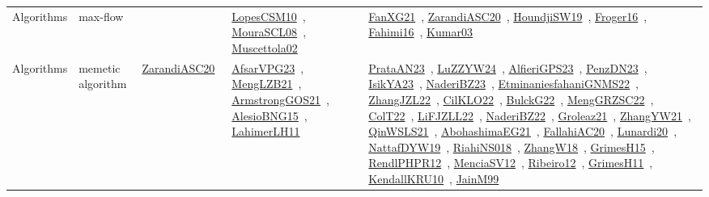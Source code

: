 {\begin{longtable}{lp{3cm}>{\raggedright\arraybackslash}p{6cm}>{\raggedright\arraybackslash}p{6cm}>{\raggedright\arraybackslash}p{8cm}}
\index{max-flow}\index{Algorithms!max-flow}Algorithms & max-flow &  & \href{../works/LopesCSM10.pdf}{LopesCSM10}~\cite{LopesCSM10}, \href{../works/MouraSCL08.pdf}{MouraSCL08}~\cite{MouraSCL08}, \href{../works/Muscettola02.pdf}{Muscettola02}~\cite{Muscettola02} & \href{../works/FanXG21.pdf}{FanXG21}~\cite{FanXG21}, \href{../works/ZarandiASC20.pdf}{ZarandiASC20}~\cite{ZarandiASC20}, \href{../works/HoundjiSW19.pdf}{HoundjiSW19}~\cite{HoundjiSW19}, \href{../works/Froger16.pdf}{Froger16}~\cite{Froger16}, \href{../works/Fahimi16.pdf}{Fahimi16}~\cite{Fahimi16}, \href{../works/Kumar03.pdf}{Kumar03}~\cite{Kumar03}\\
\index{memetic algorithm}\index{Algorithms!memetic algorithm}Algorithms & memetic algorithm & \href{../works/ZarandiASC20.pdf}{ZarandiASC20}~\cite{ZarandiASC20} & \href{../works/AfsarVPG23.pdf}{AfsarVPG23}~\cite{AfsarVPG23}, \href{../works/MengLZB21.pdf}{MengLZB21}~\cite{MengLZB21}, \href{../works/ArmstrongGOS21.pdf}{ArmstrongGOS21}~\cite{ArmstrongGOS21}, \href{../works/AlesioBNG15.pdf}{AlesioBNG15}~\cite{AlesioBNG15}, \href{../works/LahimerLH11.pdf}{LahimerLH11}~\cite{LahimerLH11} & \href{../works/PrataAN23.pdf}{PrataAN23}~\cite{PrataAN23}, \href{../works/LuZZYW24.pdf}{LuZZYW24}~\cite{LuZZYW24}, \href{../works/AlfieriGPS23.pdf}{AlfieriGPS23}~\cite{AlfieriGPS23}, \href{../works/PenzDN23.pdf}{PenzDN23}~\cite{PenzDN23}, \href{../works/IsikYA23.pdf}{IsikYA23}~\cite{IsikYA23}, \href{../works/NaderiBZ23.pdf}{NaderiBZ23}~\cite{NaderiBZ23}, \href{../works/EtminaniesfahaniGNMS22.pdf}{EtminaniesfahaniGNMS22}~\cite{EtminaniesfahaniGNMS22}, \href{../works/ZhangJZL22.pdf}{ZhangJZL22}~\cite{ZhangJZL22}, \href{../works/CilKLO22.pdf}{CilKLO22}~\cite{CilKLO22}, \href{../works/BulckG22.pdf}{BulckG22}~\cite{BulckG22}, \href{../works/MengGRZSC22.pdf}{MengGRZSC22}~\cite{MengGRZSC22}, \href{../works/ColT22.pdf}{ColT22}~\cite{ColT22}, \href{../works/LiFJZLL22.pdf}{LiFJZLL22}~\cite{LiFJZLL22}, \href{../works/NaderiBZ22.pdf}{NaderiBZ22}~\cite{NaderiBZ22}, \href{../works/Groleaz21.pdf}{Groleaz21}~\cite{Groleaz21}, \href{../works/ZhangYW21.pdf}{ZhangYW21}~\cite{ZhangYW21}, \href{../works/QinWSLS21.pdf}{QinWSLS21}~\cite{QinWSLS21}, \href{../works/AbohashimaEG21.pdf}{AbohashimaEG21}~\cite{AbohashimaEG21}, \href{../works/FallahiAC20.pdf}{FallahiAC20}~\cite{FallahiAC20}, \href{../works/Lunardi20.pdf}{Lunardi20}~\cite{Lunardi20}, \href{../works/NattafDYW19.pdf}{NattafDYW19}~\cite{NattafDYW19}, \href{../works/RiahiNS018.pdf}{RiahiNS018}~\cite{RiahiNS018}, \href{../works/ZhangW18.pdf}{ZhangW18}~\cite{ZhangW18}, \href{../works/GrimesH15.pdf}{GrimesH15}~\cite{GrimesH15}, \href{../works/RendlPHPR12.pdf}{RendlPHPR12}~\cite{RendlPHPR12}, \href{../works/MenciaSV12.pdf}{MenciaSV12}~\cite{MenciaSV12}, \href{../works/Ribeiro12.pdf}{Ribeiro12}~\cite{Ribeiro12}, \href{../works/GrimesH11.pdf}{GrimesH11}~\cite{GrimesH11}, \href{../works/KendallKRU10.pdf}{KendallKRU10}~\cite{KendallKRU10}, \href{../works/JainM99.pdf}{JainM99}~\cite{JainM99}\\

\end{longtable}}
